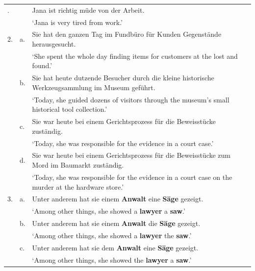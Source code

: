 \begin{table}
\begin{tabularx}{\textwidth}{llX}
\lsptoprule
1. & & Jana ist richtig müde von der Arbeit.                                                              \\
   & & `Jana is very tired from work.'                                                                    \\
   \midrule
2. & a. & Sie hat den ganzen Tag im Fundbüro für Kunden Gegenstände herausgesucht.                           \\
   & & `She spent the whole day finding items for customers at the lost and found.'                       \\
   & b. & Sie hat heute dutzende Besucher durch die kleine historische Werkzeugsammlung im Museum geführt.   \\
   & & `Today, she guided dozens of visitors through the museum's small historical tool collection.'      \\
   & c. & Sie war heute bei einem Gerichtsprozess für die Beweisstücke zuständig.                            \\
   & & `Today, she was responsible for the evidence in a court case.'                                     \\
   & d. & Sie war heute bei einem Gerichtsprozess für die Beweisstücke zum Mord im Baumarkt zuständig.       \\
   & & `Today, she was responsible for the evidence in a court case on the murder at the hardware store.' \\ \midrule
3. & a. & Unter anderem hat sie einem \textbf{Anwalt} eine \textbf{Säge} gezeigt.                                              \\
   & & `Among other things, she showed a \textbf{lawyer} a \textbf{saw}.'                                                   \\
   & b. & Unter anderem hat sie einem \textbf{Anwalt} die \textbf{Säge} gezeigt.                                               \\
   & & `Among other things, she showed a \textbf{lawyer} the \textbf{saw}.'                                                 \\
   & c. & Unter anderem hat sie dem \textbf{Anwalt} eine \textbf{Säge} gezeigt.                                                \\
   & & `Among other things, she showed the \textbf{lawyer} a \textbf{saw}.'                                                 \\

\end{tabularx}
\end{table}
